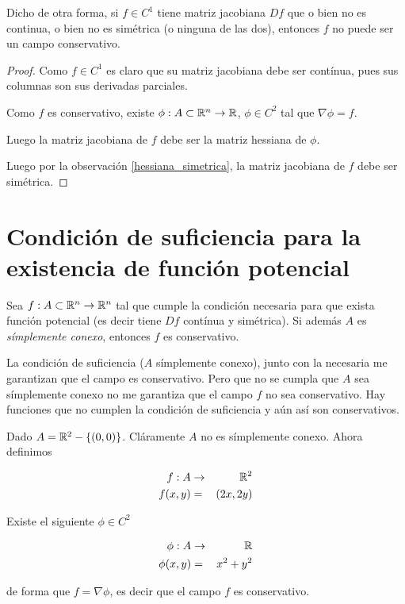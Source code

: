Dicho de otra forma, si $ f \in C^1$ tiene matriz jacobiana $Df$ que o bien no es continua, o bien no es simétrica (o ninguna de las dos), entonces $f$ no puede ser un campo conservativo.

\begin{proof}
Como $f \in C^1$ es claro que su matriz jacobiana debe ser contínua, pues sus columnas son sus derivadas parciales.

Como $f$ es conservativo, existe $\phi : A \subset \mathbb{R}^n \to \mathbb{R}$, $ \phi \in C^2$ tal que $\nabla \phi = f$.  

Luego la matriz jacobiana de $f$ debe ser la matriz hessiana de $\phi$. 

Luego por la observación \ref{hessiana_simetrica}, la matriz jacobiana de $f$ debe ser simétrica.
\end{proof}

\section{Condición de suficiencia para la existencia de función potencial}

\begin{theorem} \label{suficiente_potencial} 
Sea $ f : A \subset \mathbb{R}^n \to \mathbb{R}^n$ tal que cumple la condición necesaria para que exista función potencial (es decir tiene $Df$ contínua y simétrica).  Si además $ A$ es \emph{símplemente conexo}, entonces $f$ es conservativo.
\end{theorem}

\begin{observation}
La condición de suficiencia ($A$ símplemente conexo), junto con la necesaria me garantizan que el campo es conservativo.  Pero que no se cumpla que $A$ sea símplemente conexo no me garantiza que el campo $f$ no sea conservativo.  Hay funciones que no cumplen la condición de suficiencia y aún así son conservativos.
\end{observation}

\begin{example}
Dado $ A = \mathbb{R}^2 - \{(0,0)\}$.  Cláramente $A$ no es símplemente conexo.  Ahora definimos

\begin{eqnarray*} f : A &\to& \mathbb{R}^2 \\
f(x,y) &=& (2x, 2y) \end{eqnarray*}

Existe el siguiente $\phi \in C^2$

\begin{eqnarray*} \phi : A &\to& \mathbb{R} \\
\phi(x,y) &=& x^2 + y^2 \end{eqnarray*}

de forma que $f = \nabla \phi$, es decir que el campo $f$ es conservativo.
\end{example}


